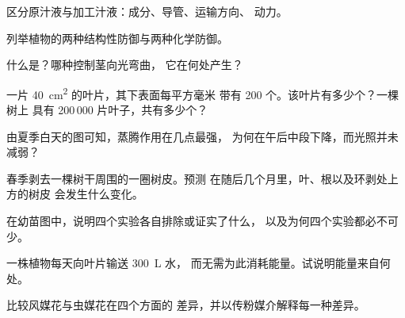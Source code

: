 \begin{exercise}[$\star$]\label{exo:g12:plant-rooted-life:3}
区分原汁液与加工汁液：成分、导管、运输方向、
动力。
\end{exercise}

\begin{exercise}[$\star$]\label{exo:g12:plant-rooted-life:4}
列举植物的两种结构性防御与两种化学防御。
\end{exercise}

\begin{exercise}[$\star$]\label{exo:g12:plant-rooted-life:5}
什么是？哪种控制茎向光弯曲，
它在何处产生？
\end{exercise}

\begin{exercise}[$\star\star$]\label{exo:g12:plant-rooted-life:6}
一片 \qty{40}{cm^2} 的叶片，其下表面每平方毫米
带有 200 个。该叶片有多少个？一棵树上
具有 200\,000 片叶子，共有多少个？
\end{exercise}

\begin{exercise}[$\star\star$]\label{exo:g12:plant-rooted-life:7}
由夏季白天的图可知，蒸腾作用在几点最强，
为何在午后中段下降，而光照并未减弱？
\end{exercise}

\begin{exercise}[$\star\star$]\label{exo:g12:plant-rooted-life:8}
春季剥去一棵树干周围的一圈树皮。预测
在随后几个月里，叶、根以及环剥处上方的树皮
会发生什么变化。
\end{exercise}

\begin{exercise}[$\star\star$]\label{exo:g12:plant-rooted-life:9}
在幼苗图中，说明四个实验各自排除或证实了什么，
以及为何四个实验都必不可少。
\end{exercise}

\begin{exercise}[$\star\star$]\label{exo:g12:plant-rooted-life:10}
一株植物每天向叶片输送 \qty{300}{L} 水，
而无需为此消耗能量。试说明能量来自何处。
\end{exercise}

\begin{exercise}[$\star\star$]\label{exo:g12:plant-rooted-life:11}
比较风媒花与虫媒花在四个方面的
差异，并以传粉媒介解释每一种差异。
\end{exercise}

